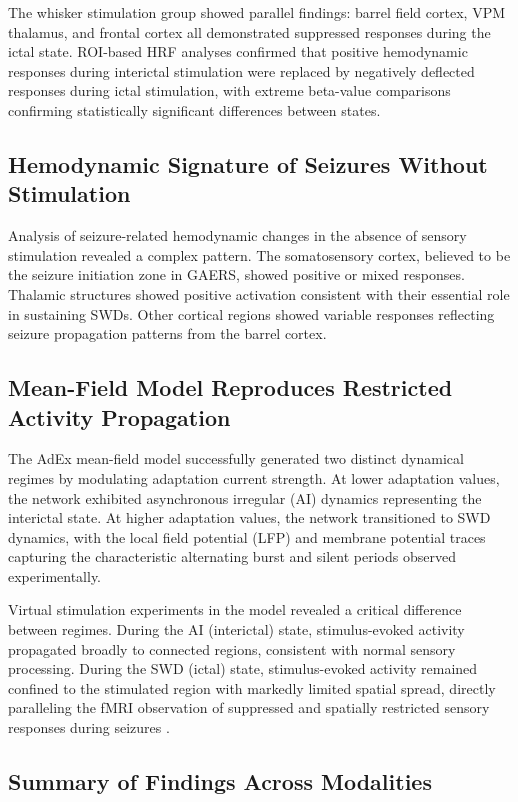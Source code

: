 \documentclass[12pt]{article}
\begin{document}
The whisker stimulation group showed parallel findings: barrel field cortex, VPM thalamus, and frontal cortex all demonstrated suppressed responses during the ictal state. ROI-based HRF analyses confirmed that positive hemodynamic responses during interictal stimulation were replaced by negatively deflected responses during ictal stimulation, with extreme beta-value comparisons confirming statistically significant differences between states.

\subsection{Hemodynamic Signature of Seizures Without Stimulation}

Analysis of seizure-related hemodynamic changes in the absence of sensory stimulation revealed a complex pattern. The somatosensory cortex, believed to be the seizure initiation zone in GAERS, showed positive or mixed responses. Thalamic structures showed positive activation consistent with their essential role in sustaining SWDs. Other cortical regions showed variable responses reflecting seizure propagation patterns from the barrel cortex.

\subsection{Mean-Field Model Reproduces Restricted Activity Propagation}

The AdEx mean-field model successfully generated two distinct dynamical regimes by modulating adaptation current strength. At lower adaptation values, the network exhibited asynchronous irregular (AI) dynamics representing the interictal state. At higher adaptation values, the network transitioned to SWD dynamics, with the local field potential (LFP) and membrane potential traces capturing the characteristic alternating burst and silent periods observed experimentally.

Virtual stimulation experiments in the model revealed a critical difference between regimes. During the AI (interictal) state, stimulus-evoked activity propagated broadly to connected regions, consistent with normal sensory processing. During the SWD (ictal) state, stimulus-evoked activity remained confined to the stimulated region with markedly limited spatial spread, directly paralleling the fMRI observation of suppressed and spatially restricted sensory responses during seizures \citep{destexhe2009selforganized}.

\subsection{Summary of Findings Across Modalities}
\end{document}
